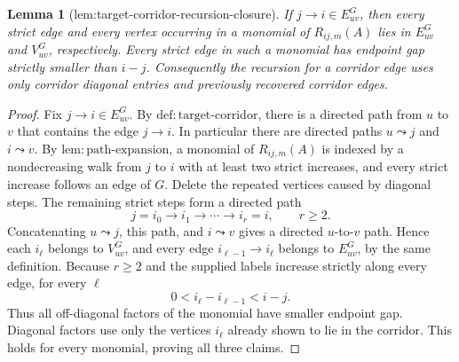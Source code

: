 \documentclass{article}
\newtheorem{lemma}{Lemma}
\begin{document}
\begin{lemma}[lem:target-corridor-recursion-closure]\label{lem:target-corridor-recursion-closure}
If \(j\to i\in E_{uv}^{G}\), then every strict edge and every vertex occurring in a monomial of \(R_{ij,m}(A)\) lies in \(E_{uv}^{G}\) and \(V_{uv}^{G}\), respectively.  Every strict edge in such a monomial has endpoint gap strictly smaller than \(i-j\).  Consequently the recursion for a corridor edge uses only corridor diagonal entries and previously recovered corridor edges.
\end{lemma}
\begin{proof}
Fix \(j\to i\in E_{uv}^{G}\).  By \(\mathrm{def{:}target\mbox{-}corridor}\), there is a directed path from \(u\) to \(v\) that contains the edge \(j\to i\).  In particular there are directed paths \(u\leadsto j\) and \(i\leadsto v\).  By \(\mathrm{lem{:}path\mbox{-}expansion}\), a monomial of \(R_{ij,m}(A)\) is indexed by a nondecreasing walk from \(j\) to \(i\) with at least two strict increases, and every strict increase follows an edge of \(G\).  Delete the repeated vertices caused by diagonal steps.  The remaining strict steps form a directed path
\[
 j=i_0\to i_1\to\cdots\to i_r=i,
 \qquad r\ge2.
\]
Concatenating \(u\leadsto j\), this path, and \(i\leadsto v\) gives a directed \(u\)-to-\(v\) path.  Hence each \(i_\ell\) belongs to \(V_{uv}^{G}\), and every edge \(i_{\ell-1}\to i_\ell\) belongs to \(E_{uv}^{G}\), by the same definition.  Because \(r\ge2\) and the supplied labels increase strictly along every edge, for every \(\ell\)
\[
 0<i_\ell-i_{\ell-1}<i-j.
\]
Thus all off-diagonal factors of the monomial have smaller endpoint gap.  Diagonal factors use only the vertices \(i_\ell\) already shown to lie in the corridor.  This holds for every monomial, proving all three claims.
\end{proof}
\end{document}
